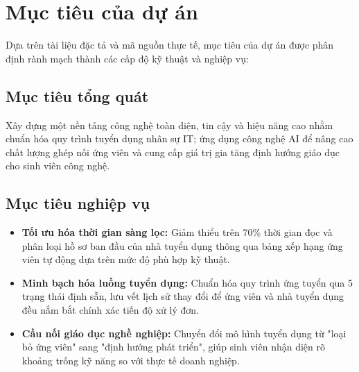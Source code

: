 \section{Mục tiêu của dự án}
\label{sec:muc-tieu}

Dựa trên tài liệu đặc tả và mã nguồn thực tế, mục tiêu của dự án được phân định rành mạch thành các cấp độ kỹ thuật và nghiệp vụ:

\subsection{Mục tiêu tổng quát}
Xây dựng một nền tảng công nghệ toàn diện, tin cậy và hiệu năng cao nhằm chuẩn hóa quy trình tuyển dụng nhân sự IT; ứng dụng công nghệ AI để nâng cao chất lượng ghép nối ứng viên và cung cấp giá trị gia tăng định hướng giáo dục cho sinh viên công nghệ.

\subsection{Mục tiêu nghiệp vụ}
\begin{itemize}
    \item \textbf{Tối ưu hóa thời gian sàng lọc:} Giảm thiểu trên 70\% thời gian đọc và phân loại hồ sơ ban đầu của nhà tuyển dụng thông qua bảng xếp hạng ứng viên tự động dựa trên mức độ phù hợp kỹ thuật.
    \item \textbf{Minh bạch hóa luồng tuyển dụng:} Chuẩn hóa quy trình ứng tuyển qua 5 trạng thái định sẵn, lưu vết lịch sử thay đổi để ứng viên và nhà tuyển dụng đều nắm bắt chính xác tiến độ xử lý đơn.
    \item \textbf{Cầu nối giáo dục nghề nghiệp:} Chuyển đổi mô hình tuyển dụng từ "loại bỏ ứng viên" sang "định hướng phát triển", giúp sinh viên nhận diện rõ khoảng trống kỹ năng so với thực tế doanh nghiệp.
\end{itemize}

